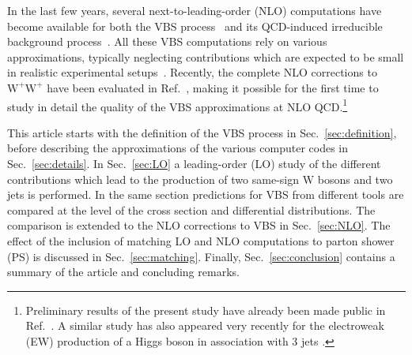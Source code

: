 \documentclass[twocolumn,epjc3]{svjour3} %
\newcommand{\PW}{\ensuremath{\text{W}}\xspace}
\begin{document}
In the last few years, several next-to-leading-order (NLO) computations have become available for both the VBS process~\cite{Jager:2006zc,Jager:2006cp,Bozzi:2007ur,Jager:2009xx,Jager:2011ms,Denner:2012dz,Rauch:2016pai} and its QCD-induced irreducible background process~\cite{Rauch:2016pai,Melia:2010bm,Melia:2011gk,Campanario:2013gea,Baglio:2014uba}.
All these VBS computations rely on various approximations, typically neglecting contributions which are expected to be small in realistic experimental setups~\cite{Denner:2012dz,Oleari:2003tc}.
Recently, the complete NLO corrections to $\PW^+\PW^+$ have been evaluated in Ref.~\cite{Biedermann:2017bss}, 
making it possible for the first time to study in detail the quality of the VBS approximations at NLO QCD.\footnote{Preliminary results of the present study have already been made public in Ref.~\cite{Anders:2018gfr}. 
A similar study has also appeared very recently for the electroweak (EW) production of a Higgs boson in association with 3 jets \cite{Campanario:2018ppz}.}

This article starts with the definition of the VBS process in Sec.~\ref{sec:definition}, before describing the approximations of the various computer 
codes in Sec.~\ref{sec:details}. In Sec.~\ref{sec:LO} a leading-order (LO) study 
of the different contributions which lead to the production of two same-sign $\PW$ bosons and 
two jets is performed. In the same section predictions for VBS from different tools are compared at 
the level of the cross section and differential distributions.
The comparison is extended to the
NLO corrections to VBS in Sec.~\ref{sec:NLO}. The effect of the inclusion of matching LO and NLO computations to parton shower (PS) is 
discussed in Sec.~\ref{sec:matching}. Finally,
Sec.~\ref{sec:conclusion} contains a summary of the article and concluding remarks.
\end{document}
